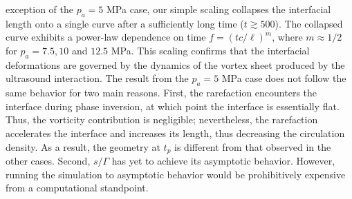 \documentclass{jfm}%
\begin{document}
exception of the $p_a = 5$ MPa case, our simple scaling collapses the
interfacial length onto a single curve after a sufficiently long time
($t\gtrsim 500$). The collapsed curve exhibits a power-law dependence
on time $f=(tc/\ell)^m$, where $m \approx 1/2$ for $p_a = 7.5, 10$ and
$12.5$ MPa. This scaling confirms that the interfacial deformations
are governed by the dynamics of the vortex sheet produced by the
ultrasound interaction. The result from the $p_a = 5$ MPa case does
not follow the same behavior for two main reasons. First, the
rarefaction encounters the interface during phase inversion, at which
point the interface is essentially flat.  Thus, the vorticity
contribution is negligible; nevertheless, the rarefaction accelerates
the interface and increases its length, thus decreasing the
circulation density. As a result, the geometry at $t_p$ is different
from that observed in the other cases.  Second, $s/\Gamma$ has yet to
achieve its asymptotic behavior.  However, running the simulation to
asymptotic behavior would be prohibitively expensive from a
computational standpoint.
\end{document}
